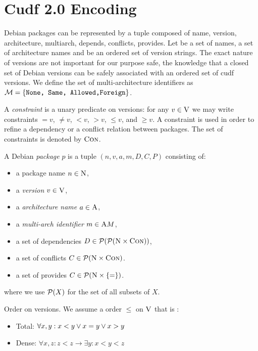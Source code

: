 \section{Cudf 2.0 Encoding}

Debian packages can be represented by a tuple composed of name,
version, architecture, multiarch, depends, conflicts, provides. Let
\names{} be a set of names, \architectures{} a set of architecture
names and \versions{} be an ordered set of version strings. The exact
nature of versions are not important for our purpose safe, the
knowledge that a closed set of Debian versions can be safely
associated with an ordered set of cudf versions. We define the set of
multi-architecture identifiers as $\cal{M} = \{ \texttt{None, Same,
Allowed,Foreign} \}$.

A \emph{constraint} is a unary predicate on versions: for any $v \in
\versions$ we may write constraints $=v$, $\neq v$, $<v$, $>v$, $\leq
v$, and $\geq v$.  A constraint is used in order to refine a
dependency or a conflict relation between packages. The set of
constraints is denoted by $\con$.

\begin{definition} 
  A Debian \emph{package} $p$ is a tuple $(n,v,a,m,D,C,P)$ consisting of:
  \begin{itemize}
    \item a {\rm package name} $n \in \names$,
    \item a {\em version} $v \in \versions$,
    \item a {\em architecture name} $a \in \architectures{}$,
    \item a {\em multi-arch identifier} $m \in \multiarchs{M}$,
    \item a set of dependencies $D \in\power{\power{\names\times\con}}$,
    \item a set of conflicts $C \in\power{\names\times\con}$.
    \item a set of provides $C \in\power{\names\times \{ = \} }$.
  \end{itemize}
\end{definition}
where we use $\power{X}$ for the set of all subsets of $X$.

\begin{definition}{Order on versions.}
  We assume a order $\leq$ on $\versions$ that is :
  \begin{itemize}
    \item Total: $\forall x,y : x < y \Or x=y \Or x > y$
    \item Dense: $\forall x,z : z < z \rightarrow \exists y : x < y < z$
  \end{itemize}
\end{definition}


